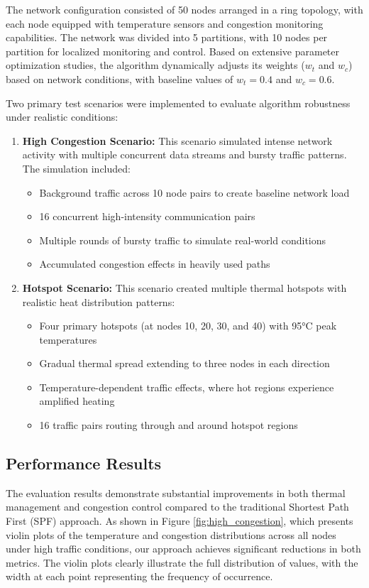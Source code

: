 \documentclass[conference]{IEEEtran}
\begin{document}
The network configuration consisted of 50 nodes arranged in a ring topology, with each node equipped with temperature sensors and congestion monitoring capabilities. The network was divided into 5 partitions, with 10 nodes per partition for localized monitoring and control. Based on extensive parameter optimization studies, the algorithm dynamically adjusts its weights ($w_t$ and $w_c$) based on network conditions, with baseline values of $w_t = 0.4$ and $w_c = 0.6$.

Two primary test scenarios were implemented to evaluate algorithm robustness under realistic conditions:

\begin{enumerate}
    \item \textbf{High Congestion Scenario:} This scenario simulated intense network activity with multiple concurrent data streams and bursty traffic patterns. The simulation included:
\begin{itemize}
        \item Background traffic across 10 node pairs to create baseline network load
        \item 16 concurrent high-intensity communication pairs
        \item Multiple rounds of bursty traffic to simulate real-world conditions
        \item Accumulated congestion effects in heavily used paths
\end{itemize}

    \item \textbf{Hotspot Scenario:} This scenario created multiple thermal hotspots with realistic heat distribution patterns:
\begin{itemize}
        \item Four primary hotspots (at nodes 10, 20, 30, and 40) with 95°C peak temperatures
        \item Gradual thermal spread extending to three nodes in each direction
        \item Temperature-dependent traffic effects, where hot regions experience amplified heating
        \item 16 traffic pairs routing through and around hotspot regions
\end{itemize}
\end{enumerate}

\subsection{Performance Results}
The evaluation results demonstrate substantial improvements in both thermal management and congestion control compared to the traditional Shortest Path First (SPF) approach. As shown in Figure \ref{fig:high_congestion}, which presents violin plots of the temperature and congestion distributions across all nodes under high traffic conditions, our approach achieves significant reductions in both metrics. The violin plots clearly illustrate the full distribution of values, with the width at each point representing the frequency of occurrence.
\end{document}
